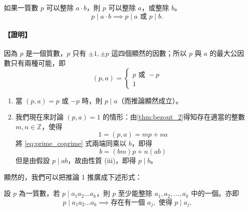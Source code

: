 \begin{corollary}\label{cor:prime_div_prod}
如果一質數 $p$ 可以整除 $a \cdot b$，則 $p$ 可以整除 $a$，或整除 $b$。
\begin{equation}
  p \mid a \cdot b \implies p \mid a \text{ 或 } p \mid b. \label{eq:euclid_lemma}
\end{equation}
\end{corollary}

\paragraph{【證明】}
因為 $p$ 是一個質數，$p$ 只有 $\pm 1, \pm p$ 這四個顯然的因數；所以 $p$ 與 $a$ 的最大公因數只有兩種可能，即
\begin{equation*}
  (p, a) = \begin{cases} p \text{ 或 } -p \\ 1 \end{cases}
\end{equation*}
\begin{enumerate}[(1)]
  \item 當 $(p, a) = p$ 或 $-p$ 時，則 $p \mid a$（而推論顯然成立）。
  \item 我們現在來討論 $(p, a) = 1$ 的情形：由\cref{thm:bezout_2}得知存在適當的整數 $m, n \in \mathbb{Z}$，使得
  \begin{equation}
    1 = (p, a) = mp + na \label{eq:prime_coprime}
  \end{equation}
  將 \eqref{eq:prime_coprime} 式兩端同乘以 $b$，即得
  \begin{equation}
    b = (bm)p + n(ab) \label{eq:prime_coprime_mul}
  \end{equation}
  但是由假設 $p \mid ab$，故由性質 (iii)，即得 $p \mid b$。
\end{enumerate}

顯然的，我們可以把推論 1 推廣成下述形式：

\begin{corollary}\label{cor:prime_div_k_prod}
設 $p$ 為一質數，若 $p \mid a_1 a_2 \dots a_k$，則 $p$ 至少能整除 $a_1, a_2, \dots, a_k$ 中的一個。亦即
\begin{equation*}
  p \mid a_1 a_2 \dots a_k \implies \text{存在有一個 } a_j, \text{ 使得 } p \mid a_j.
\end{equation*}
\end{corollary}

